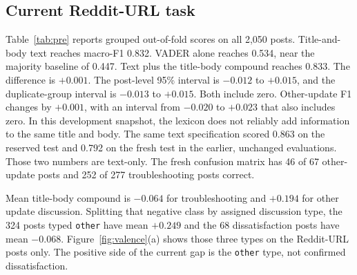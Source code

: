 \documentclass[conference,letterpaper]{IEEEtran}
\begin{document}
\subsection{Current Reddit-URL task}
Table~\ref{tab:pre} reports grouped out-of-fold scores on all 2,050 posts. Title-and-body text reaches macro-F1 0.832. VADER alone reaches 0.534, near the majority baseline of 0.447. Text plus the title-body compound reaches 0.833. The difference is $+0.001$. The post-level 95\% interval is $-0.012$ to $+0.015$, and the duplicate-group interval is $-0.013$ to $+0.015$. Both include zero. Other-update F1 changes by $+0.001$, with an interval from $-0.020$ to $+0.023$ that also includes zero. In this development snapshot, the lexicon does not reliably add information to the same title and body. The same text specification scored 0.863 on the reserved test and 0.792 on the fresh test in the earlier, unchanged evaluations. Those two numbers are text-only. The fresh confusion matrix has 46 of 67 other-update posts and 252 of 277 troubleshooting posts correct.

Mean title-body compound is $-0.064$ for troubleshooting and $+0.194$ for other update discussion. Splitting that negative class by assigned discussion type, the 324 posts typed \texttt{other} have mean $+0.249$ and the 68 dissatisfaction posts have mean $-0.068$. Figure~\ref{fig:valence}(a) shows those three types on the Reddit-URL posts only. The positive side of the current gap is the \texttt{other} type, not confirmed dissatisfaction.
\end{document}
